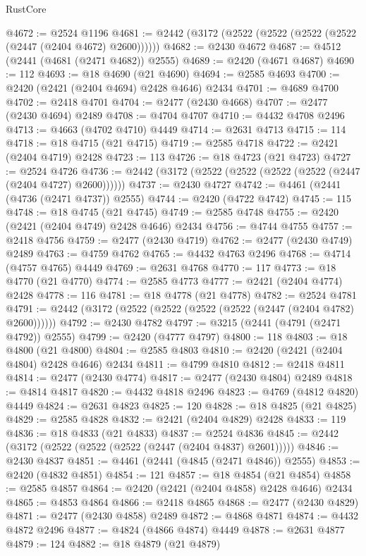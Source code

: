 \begin{lexlean}{RustCore}
\begin{coremodule}
@4672 := @2524 @1196
@4681 := @2442 (@3172 (@2522 (@2522 (@2522 (@2522 (@2447 (@2404 @4672) @2600))))))
@4682 := @2430 @4672
@4687 := @4512 (@2441 (@4681 (@2471 @4682)) @2555)
@4689 := @2420 (@4671 @4687)
@4690 := 112
@4693 := @18 @4690 (@21 @4690)
@4694 := @2585 @4693
@4700 := @2420 (@2421 (@2404 @4694) @2428 @4646) @2434
@4701 := @4689 @4700
@4702 := @2418 @4701
@4704 := @2477 (@2430 @4668)
@4707 := @2477 (@2430 @4694) @2489
@4708 := @4704 @4707
@4710 := @4432 @4708 @2496
@4713 := @4663 (@4702 @4710) @4449
@4714 := @2631 @4713
@4715 := 114
@4718 := @18 @4715 (@21 @4715)
@4719 := @2585 @4718
@4722 := @2421 (@2404 @4719) @2428
@4723 := 113
@4726 := @18 @4723 (@21 @4723)
@4727 := @2524 @4726
@4736 := @2442 (@3172 (@2522 (@2522 (@2522 (@2522 (@2447 (@2404 @4727) @2600))))))
@4737 := @2430 @4727
@4742 := @4461 (@2441 (@4736 (@2471 @4737)) @2555)
@4744 := @2420 (@4722 @4742)
@4745 := 115
@4748 := @18 @4745 (@21 @4745)
@4749 := @2585 @4748
@4755 := @2420 (@2421 (@2404 @4749) @2428 @4646) @2434
@4756 := @4744 @4755
@4757 := @2418 @4756
@4759 := @2477 (@2430 @4719)
@4762 := @2477 (@2430 @4749) @2489
@4763 := @4759 @4762
@4765 := @4432 @4763 @2496
@4768 := @4714 (@4757 @4765) @4449
@4769 := @2631 @4768
@4770 := 117
@4773 := @18 @4770 (@21 @4770)
@4774 := @2585 @4773
@4777 := @2421 (@2404 @4774) @2428
@4778 := 116
@4781 := @18 @4778 (@21 @4778)
@4782 := @2524 @4781
@4791 := @2442 (@3172 (@2522 (@2522 (@2522 (@2522 (@2447 (@2404 @4782) @2600))))))
@4792 := @2430 @4782
@4797 := @3215 (@2441 (@4791 (@2471 @4792)) @2555)
@4799 := @2420 (@4777 @4797)
@4800 := 118
@4803 := @18 @4800 (@21 @4800)
@4804 := @2585 @4803
@4810 := @2420 (@2421 (@2404 @4804) @2428 @4646) @2434
@4811 := @4799 @4810
@4812 := @2418 @4811
@4814 := @2477 (@2430 @4774)
@4817 := @2477 (@2430 @4804) @2489
@4818 := @4814 @4817
@4820 := @4432 @4818 @2496
@4823 := @4769 (@4812 @4820) @4449
@4824 := @2631 @4823
@4825 := 120
@4828 := @18 @4825 (@21 @4825)
@4829 := @2585 @4828
@4832 := @2421 (@2404 @4829) @2428
@4833 := 119
@4836 := @18 @4833 (@21 @4833)
@4837 := @2524 @4836
@4845 := @2442 (@3172 (@2522 (@2522 (@2522 (@2447 (@2404 @4837) @2601)))))
@4846 := @2430 @4837
@4851 := @4461 (@2441 (@4845 (@2471 @4846)) @2555)
@4853 := @2420 (@4832 @4851)
@4854 := 121
@4857 := @18 @4854 (@21 @4854)
@4858 := @2585 @4857
@4864 := @2420 (@2421 (@2404 @4858) @2428 @4646) @2434
@4865 := @4853 @4864
@4866 := @2418 @4865
@4868 := @2477 (@2430 @4829)
@4871 := @2477 (@2430 @4858) @2489
@4872 := @4868 @4871
@4874 := @4432 @4872 @2496
@4877 := @4824 (@4866 @4874) @4449
@4878 := @2631 @4877
@4879 := 124
@4882 := @18 @4879 (@21 @4879)

\end{coremodule}
\end{lexlean}
